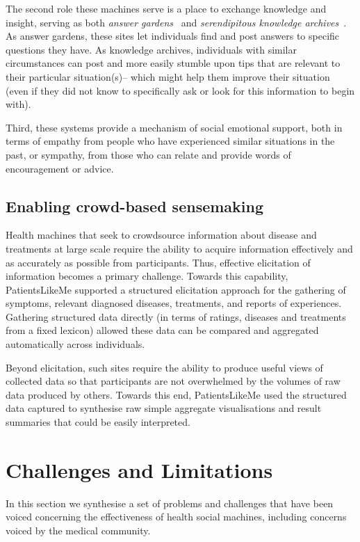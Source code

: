 \documentclass{sig-alternate}
\begin{document}
The second role these machines serve is a place to exchange knowledge
and insight, serving as both \emph{answer gardens}~\cite{answergarden}
and \emph{serendipitous knowledge archives}~\cite{knowledgearchive}.
As answer gardens, these sites let individuals find and post answers
to specific questions they have.  As knowledge archives, individuals
with similar circumstances can post and more easily stumble upon tips
that are relevant to their particular situation(s)-- which might help
them improve their situation (even if they did not know to
specifically ask or look for this information to begin with).

Third, these systems provide a mechanism of social emotional support,
both in terms of empathy from people who have experienced similar
situations in the past, or sympathy, from those who can relate and
provide words of encouragement or advice.

\subsection{Enabling crowd-based sensemaking}

Health machines that seek to crowdsource information about disease and
treatments at large scale require the ability to acquire information
effectively and as accurately as possible from participants.  Thus,
effective elicitation of information becomes a primary challenge.
Towards this capability, PatientsLikeMe supported a structured
elicitation approach for the gathering of symptoms, relevant diagnosed
diseases, treatments, and reports of experiences.  Gathering
structured data directly (in terms of ratings, diseases and treatments
from a fixed lexicon) allowed these data can be compared and
aggregated automatically across individuals.  

Beyond elicitation, such sites require the ability to produce useful
views of collected data so that participants are not overwhelmed by
the volumes of raw data produced by others.  Towards this end,
PatientsLikeMe used the structured data captured to synthesise raw
simple aggregate visualisations and result summaries that could be
easily interpreted.

\section{Challenges and Limitations}

In this section we synthesise a set of problems and challenges that
have been voiced concerning the effectiveness of health social
machines, including concerns voiced by the medical community. 
\end{document}
